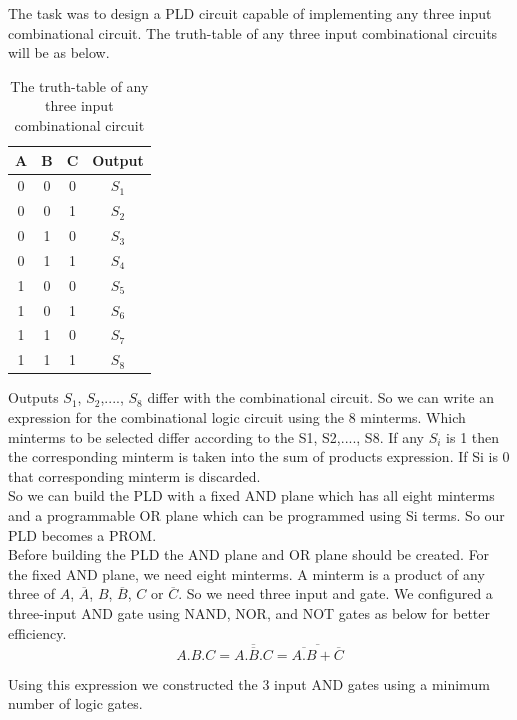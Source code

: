 \documentclass[a4paper,11pt]{article}%
\begin{document}
The task was to design a PLD circuit capable of implementing any three input combinational circuit. The truth-table of any three input combinational circuits will be as below.\\

\begin{table}[H]
\centering
	\begin{tabular}{|c |c| c| c|}
		\hline
		A&B&C& Output\\\hline
	0 & 0 & 0 & $S_1 $ \\
	0 & 0 & 1 & $S_2$ \\
	0 & 1 & 0 & $S_3$ \\
	0 & 1 & 1 & $S_4$ \\
	1 & 0 & 0 & $S_5$ \\
	1 & 0 & 1 & $S_6$ \\
	1 & 1 & 0 & $S_7$ \\
	1 & 1 & 1 & $S_8$ \\\hline\hline
	\end{tabular}
\caption{The truth-table of any three input combinational circuit}
\end{table}

Outputs $S_1$, $S_2$,...., $S_8$ differ with the combinational circuit. So we can write an expression for the combinational logic circuit using the 8 minterms. Which minterms to be selected differ according to the S1, S2,...., S8. If any $S_i$ is 1 then the corresponding minterm is taken into the sum of products expression. If Si is 0 that corresponding minterm is discarded.\\

So we can build the PLD with a fixed AND plane which has all eight minterms and a programmable OR plane which can be programmed using Si terms. So our PLD becomes a PROM.\\

Before building the PLD the AND plane and OR plane should be created. For the fixed AND plane, we need eight minterms. A minterm is a product of any three of $A$, $\overline{A}$, $B$, $\overline{B}$, $C$ or $\overline{C}$. So we need three input and gate. We configured a three-input AND gate using NAND, NOR, and NOT gates as below for better efficiency.\\

\[ A.B.C = \overline{\overline{A.B.C}} = \overline{\overline{A.B} + \overline{C}} \]

Using this expression we constructed the 3 input AND gates using a minimum number of logic gates.\\
\end{document}
